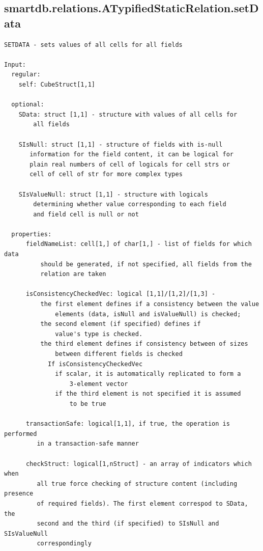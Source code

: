 \documentclass[letterpaper,10pt,english]{sphinxmanual}
\begin{document}
\subsection{smartdb.relations.ATypifiedStaticRelation.setData}
\label{chap_functions:smartdb-relations-atypifiedstaticrelation-setdata}
\begin{Verbatim}[commandchars=\\\{\}]
SETDATA - sets values of all cells for all fields

Input:
  regular:
    self: CubeStruct[1,1]

  optional:
    SData: struct [1,1] - structure with values of all cells for
        all fields

    SIsNull: struct [1,1] - structure of fields with is-null
       information for the field content, it can be logical for
       plain real numbers of cell of logicals for cell strs or
       cell of cell of str for more complex types

    SIsValueNull: struct [1,1] - structure with logicals
        determining whether value corresponding to each field
        and field cell is null or not

  properties:
      fieldNameList: cell[1,] of char[1,] - list of fields for which data
          should be generated, if not specified, all fields from the
          relation are taken

      isConsistencyCheckedVec: logical [1,1]/[1,2]/[1,3] -
          the first element defines if a consistency between the value
              elements (data, isNull and isValueNull) is checked;
          the second element (if specified) defines if
              value's type is checked.
          the third element defines if consistency between of sizes
              between different fields is checked
            If isConsistencyCheckedVec
              if scalar, it is automatically replicated to form a
                  3-element vector
              if the third element is not specified it is assumed
                  to be true

      transactionSafe: logical[1,1], if true, the operation is performed
         in a transaction-safe manner

      checkStruct: logical[1,nStruct] - an array of indicators which when
         all true force checking of structure content (including presence
         of required fields). The first element correspod to SData, the
         second and the third (if specified) to SIsNull and SIsValueNull
         correspondingly


\end{Verbatim}
\end{document}
